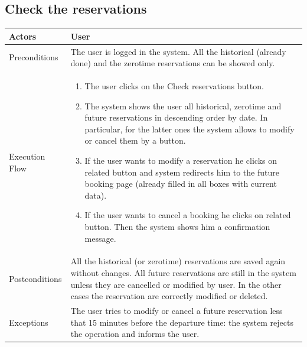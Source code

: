 \subsection{Check the reservations}
\label{requirements:CheckReservations}
\begin{tabular}{lp{8cm}}
	\hline 
	Actors & User \\ \hline
	Preconditions & The user is logged in the system.
All the historical (already done) and the zerotime \glspl{reservation} can be showed only. \\ \hline
	Execution Flow & \begin{enumerate}
					\item The user clicks on the Check \glspl{reservation} button.			
					\item The system shows the user all historical, zerotime and \gls{future} \glspl{reservation} in descending order by date. In particular, for the latter ones the system allows to modify or cancel them by a button.
					\item If the user wants to modify a \gls{reservation} he clicks on related button and system redirects him to the \gls{future} booking page (already filled in all boxes with current data).
					\item If the user wants to cancel a booking he clicks on related button. Then the system shows him a confirmation message.
				\end{enumerate}
	 \\ \hline
	 Postconditions & All the historical (or zerotime) \glspl{reservation} are saved again without changes. All \gls{future} \glspl{reservation} are still in the system unless they are cancelled or modified by user. In the other cases the \gls{reservation} are correctly modified or deleted.\\ \hline
	 Exceptions & The user tries to modify or cancel a \gls{future} \gls{reservation} less that 15 minutes before the departure time: the system rejects the operation and informs the user.  \\ \hline
\end{tabular}

\clearpage

